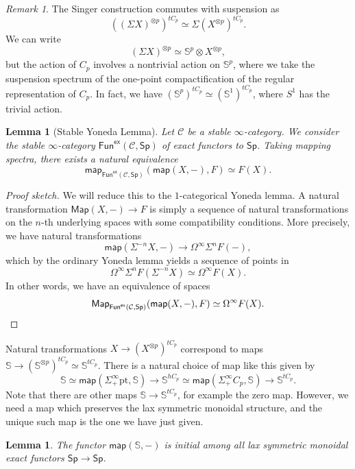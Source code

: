 \documentclass[10pt, oneside]{memoir}
\newtheorem{lem}[thm]{Lemma}
\theoremstyle{definition}
\theoremstyle{remark}
\newtheorem{rmk}[thm]{Remark}
\theoremstyle{plain}
\theoremstyle{definition}
\theoremstyle{remark}
\newcommand{\bS}{\mathbb{S}}
\newcommand{\mc}[1]{\mathcal{#1}}
\newcommand{\mr}[1]{\mathrm{#1}}
\newcommand{\ms}[1]{\mathsf{#1}}
\newcommand{\1}{\mathbf{1}}
\newcommand{\2}{\mathbf{2}}
\newcommand{\3}{\mathbf{3}}
\newcommand{\pt}{\mr{pt}}
\begin{document}
\begin{rmk}
    The Singer construction commutes with suspension as
    \[ ((\Sigma X)^{\otimes p})^{t C_p} \simeq \Sigma (X^{\otimes p})^{t C_p}. \]
    We can write
    \[ (\Sigma X)^{\otimes p} \simeq \bS^p \otimes X^{\otimes p}, \]
    but the action of \(C_p \) involves a nontrivial action on \(\bS^p \), where we take the suspension spectrum of the one-point compactification of the regular representation of \(C_p \). In fact, we have \((\bS^p)^{t C_p} \simeq (\bS^1)^{t C_p} \), where \(S^1 \) has the trivial action.
\end{rmk}

\begin{lem}[Stable Yoneda Lemma]
    Let \(\mc{C} \) be a stable \(\infty \)-category. We consider the stable \(\infty \)-category \(\ms{Fun}^{\ms{ex}}(\mc{C}, \ms{Sp}) \) of exact functors to \(\ms{Sp} \). Taking mapping spectra, there exists a natural equivalence
    \[ \ms{map}_{\ms{Fun}^{\ms{ex}}(\mc{C}, \ms{Sp})} (\ms{map}(X, -), F) \simeq F(X). \]
\end{lem}

\begin{proof}[Proof sketch]
    We will reduce this to the \(1 \)-categorical Yoneda lemma. A natural transformation \(\ms{Map}(X, -) \to F \) is simply a sequence of natural transformations on the \(n \)-th underlying spaces with some compatibility conditions. More precisely, we have natural transformations
    \[ \ms{map}(\Sigma^{-n} X, -) \to \Omega^{\infty} \Sigma^n F(-), \]
    which by the ordinary Yoneda lemma yields a sequence of points in 
    \[ \Omega^{\infty} \Sigma^n F(\Sigma^{-n} X)  \simeq \Omega^{\infty} F(X). \]
    In other words, we have an equivalence of spaces
    \[ \ms{Map}_{\ms{Fun}^{\ms{ex}}(\mc{C}, \ms{Sp})} (\ms{map}(X, -), F) \simeq \Omega^{\infty} F(X). \qedhere \]
\end{proof}

Natural transformations \(X \to (X^{\otimes p})^{t C_p} \) correspond to maps \(\bS \to (\bS^{\otimes p})^{t C_p} \simeq \bS^{t C_p} \). There is a natural choice of map like this given by
\[ \bS \simeq \ms{map}(\Sigma_+^{\infty} \pt, \bS) \to \bS^{h C_p} \simeq \ms{map}(\Sigma_+^{\infty} C_p, \bS) \to \bS^{t C_p}. \]
Note that there are other maps \(\bS \to \bS^{t C_p} \), for example the zero map. However, we need a map which preserves the lax symmetric monoidal structure, and the unique such map is the one we have just given.

\begin{lem}
    The functor \(\ms{map}(\bS, -) \) is initial among all lax symmetric monoidal exact functors \(\ms{Sp} \to \ms{Sp} \).
\end{lem}
\end{document}
